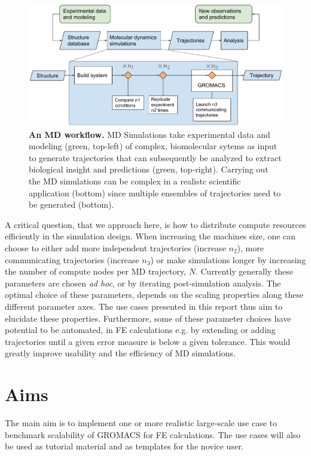 \documentclass[11pt,a4paper]{article}
\begin{document}
\begin{figure}[thbp!]
\includegraphics[width=1\textwidth]{figs/md-workflow.pdf}
\caption{\label{fig:mdworkflow}
\textbf{An MD workflow.} 
MD Simulations take experimental data and modeling (green, top-left) of complex, biomolecular sytems as input to generate trajectories that can subsequently be analyzed to extract biological insight and predictions (green, top-right). Carrying out the MD simulations can be complex in a realistc scientific application (bottom) since multiple ensembles of trajectories need to be generated (bottom). 
}
\end{figure}

A critical question, that we approach here, is how to distribute compute resources efficiently in the simulation design. 
When increasing the machines size, one can choose to either add more independent trajectories (increase $n_2$), more communicating trajectories (increase $n_3$) or make simulations longer by increasing the number of compute nodes per MD trajectory,  $N$. Currently generally these parameters are chosen \textit{ad hoc}, or by iterating  post-simulation analysis.
The optimal choice of these parameters, depends on the scaling properties along these different parameter axes. The use cases presented in this report thus aim to  elucidate these properties.
Furthermore, some of these parameter choices have potential to be automated, in FE calculations e.g. by extending or adding trajectories until a given error measure is below a given tolerance. This would greatly improve usability and the efficiency of MD simulations. 

\section{Aims}
The main aim is to implement one or more realistic large-scale use case to benchmark scalability of GROMACS for FE calculations. The use cases will also be used as tutorial material and as templates for the novice user. 
\end{document}

